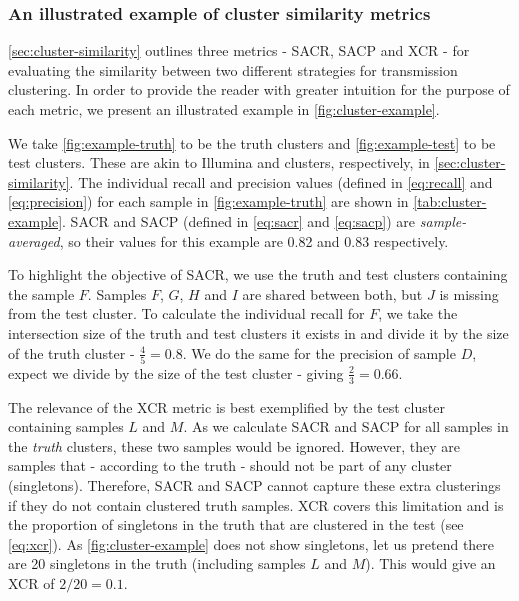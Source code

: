 
\subsubsection{An illustrated example of cluster similarity metrics}
\label{sec:cluster-example}

\autoref{sec:cluster-similarity} outlines three metrics - SACR, SACP and XCR - for evaluating the similarity between two different strategies for transmission clustering. In order to provide the reader with greater intuition for the purpose of each metric, we present an illustrated example in \autoref{fig:cluster-example}. 

We take \autoref{fig:example-truth} to be the truth clusters and \autoref{fig:example-test} to be test clusters. These are akin to Illumina and \ont{} clusters, respectively, in \autoref{sec:cluster-similarity}. The individual recall and precision values (defined in \autoref{eq:recall} and \autoref{eq:precision}) for each sample in \autoref{fig:example-truth} are shown in \autoref{tab:cluster-example}. SACR and SACP (defined in \autoref{eq:sacr} and \autoref{eq:sacp}) are \emph{sample-averaged}, so their values for this example are 0.82 and 0.83 respectively. 

To highlight the objective of SACR, we use the truth and test clusters containing the sample $F$. Samples $F$, $G$, $H$ and $I$ are shared between both, but $J$ is missing from the test cluster. To calculate the individual recall for $F$, we take the intersection size of the truth and test clusters it exists in and divide it by the size of the truth cluster - $\frac{4}{5}=0.8$. We do the same for the precision of sample $D$, expect we divide by the size of the test cluster - giving $\frac{2}{3}=0.66$. 

The relevance of the XCR metric is best exemplified by the test cluster containing samples $L$ and $M$. As we calculate SACR and SACP for all samples in the \emph{truth} clusters, these two samples would be ignored. However, they are samples that - according to the truth - should not be part of any cluster (singletons). Therefore, SACR and SACP cannot capture these extra clusterings if they do not contain clustered truth samples. XCR covers this limitation and is the proportion of singletons in the truth that are clustered in the test (see \autoref{eq:xcr}). As \autoref{fig:cluster-example} does not show singletons, let us pretend there are 20 singletons in the truth (including samples $L$ and $M$). This would give an XCR of $2/20=0.1$.

